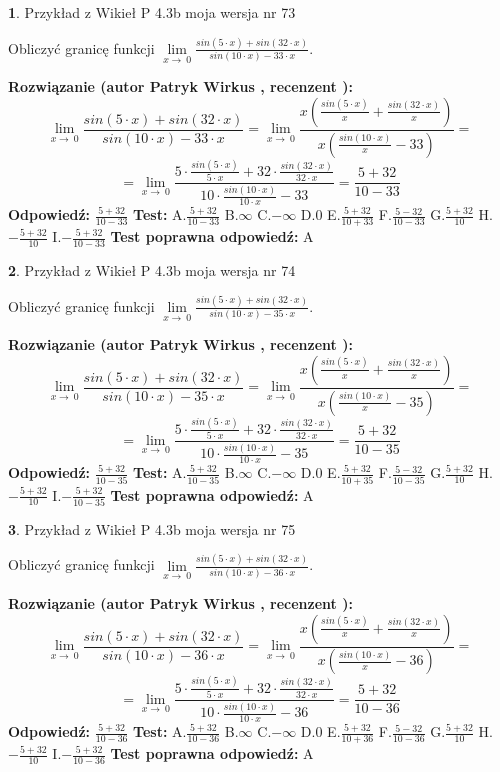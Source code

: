 \documentclass[12pt, a4paper]{article}
\theoremstyle{definition} %
\newtheorem{zad}{}
\newcommand{\zadStart}[1]{\begin{zad}#1\newline}
\newcommand{\zadStop}{\end{zad}}
\newcommand{\rozwStart}[2]{\noindent \textbf{Rozwiązanie (autor #1 , recenzent #2): }\newline}
\newcommand{\rozwStop}{\newline}
\newcommand{\odpStart}{\noindent \textbf{Odpowiedź:}\newline}
\newcommand{\odpStop}{\newline}
\newcommand{\testStart}{\noindent \textbf{Test:}\newline}
\newcommand{\testStop}{\newline}
\newcommand{\kluczStart}{\noindent \textbf{Test poprawna odpowiedź:}\newline}
\newcommand{\kluczStop}{\newline}
\begin{document}
\zadStart{Przykład z Wikieł P 4.3b moja wersja nr 73}


Obliczyć granicę funkcji $\lim\limits_{x\to\ 0}\frac{sin(5 \cdot x)+sin(32 \cdot x)}{sin(10 \cdot x)-33 \cdot x}$.
\zadStop
\rozwStart{Patryk Wirkus}{}
$$\lim\limits_{x\to\ 0}\frac{sin(5 \cdot x)+sin(32 \cdot x)}{sin(10 \cdot x)-33 \cdot x}=\lim\limits_{x\to\ 0}\frac{x(\frac{sin(5 \cdot x)}{x}+\frac{sin(32 \cdot x)}{x})}{x(\frac{sin(10 \cdot x)}{x}-33)}=$$
$$=\lim\limits_{x\to\ 0}\frac{5 \cdot \frac{sin(5 \cdot x)}{5 \cdot x}+32 \cdot \frac{sin(32 \cdot x)}{32 \cdot x}}{10 \cdot \frac{sin(10 \cdot x)}{10 \cdot x}-33}=\frac{5+32}{10-33}$$
\rozwStop
\odpStart
$\frac{5+32}{10-33}$
\odpStop
\testStart
A.$\frac{5+32}{10-33}$
B.$\infty$
C.$-\infty$
D.$0$
E.$\frac{5+32}{10+33}$
F.$\frac{5-32}{10-33}$
G.$\frac{5+32}{10}$
H.$-\frac{5+32}{10}$
I.$-\frac{5+32}{10-33}$
\testStop
\kluczStart
A
\kluczStop



\zadStart{Przykład z Wikieł P 4.3b moja wersja nr 74}


Obliczyć granicę funkcji $\lim\limits_{x\to\ 0}\frac{sin(5 \cdot x)+sin(32 \cdot x)}{sin(10 \cdot x)-35 \cdot x}$.
\zadStop
\rozwStart{Patryk Wirkus}{}
$$\lim\limits_{x\to\ 0}\frac{sin(5 \cdot x)+sin(32 \cdot x)}{sin(10 \cdot x)-35 \cdot x}=\lim\limits_{x\to\ 0}\frac{x(\frac{sin(5 \cdot x)}{x}+\frac{sin(32 \cdot x)}{x})}{x(\frac{sin(10 \cdot x)}{x}-35)}=$$
$$=\lim\limits_{x\to\ 0}\frac{5 \cdot \frac{sin(5 \cdot x)}{5 \cdot x}+32 \cdot \frac{sin(32 \cdot x)}{32 \cdot x}}{10 \cdot \frac{sin(10 \cdot x)}{10 \cdot x}-35}=\frac{5+32}{10-35}$$
\rozwStop
\odpStart
$\frac{5+32}{10-35}$
\odpStop
\testStart
A.$\frac{5+32}{10-35}$
B.$\infty$
C.$-\infty$
D.$0$
E.$\frac{5+32}{10+35}$
F.$\frac{5-32}{10-35}$
G.$\frac{5+32}{10}$
H.$-\frac{5+32}{10}$
I.$-\frac{5+32}{10-35}$
\testStop
\kluczStart
A
\kluczStop



\zadStart{Przykład z Wikieł P 4.3b moja wersja nr 75}


Obliczyć granicę funkcji $\lim\limits_{x\to\ 0}\frac{sin(5 \cdot x)+sin(32 \cdot x)}{sin(10 \cdot x)-36 \cdot x}$.
\zadStop
\rozwStart{Patryk Wirkus}{}
$$\lim\limits_{x\to\ 0}\frac{sin(5 \cdot x)+sin(32 \cdot x)}{sin(10 \cdot x)-36 \cdot x}=\lim\limits_{x\to\ 0}\frac{x(\frac{sin(5 \cdot x)}{x}+\frac{sin(32 \cdot x)}{x})}{x(\frac{sin(10 \cdot x)}{x}-36)}=$$
$$=\lim\limits_{x\to\ 0}\frac{5 \cdot \frac{sin(5 \cdot x)}{5 \cdot x}+32 \cdot \frac{sin(32 \cdot x)}{32 \cdot x}}{10 \cdot \frac{sin(10 \cdot x)}{10 \cdot x}-36}=\frac{5+32}{10-36}$$
\rozwStop
\odpStart
$\frac{5+32}{10-36}$
\odpStop
\testStart
A.$\frac{5+32}{10-36}$
B.$\infty$
C.$-\infty$
D.$0$
E.$\frac{5+32}{10+36}$
F.$\frac{5-32}{10-36}$
G.$\frac{5+32}{10}$
H.$-\frac{5+32}{10}$
I.$-\frac{5+32}{10-36}$
\testStop
\kluczStart
A
\kluczStop
\end{document}
